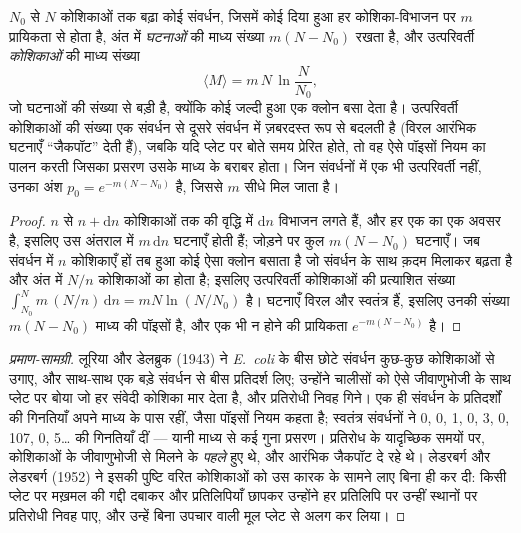 \begin{theorem}[किसी बढ़ते संवर्धन में उत्परिवर्ती]\label{thm:b2:genome-diversification:luria}
$N_0$ से $N$ कोशिकाओं तक बढ़ा कोई संवर्धन, जिसमें कोई दिया हुआ 
हर कोशिका-विभाजन पर $m$ प्रायिकता से होता है, अंत में 
\emph{घटनाओं} की माध्य संख्या $m(N - N_0)$ रखता है, और उत्परिवर्ती
\emph{कोशिकाओं} की माध्य संख्या
\[
\langle M\rangle = m\,N\,\ln\frac{N}{N_0},
\]
जो घटनाओं की संख्या से बड़ी है, क्योंकि कोई जल्दी हुआ  एक
क्लोन बसा देता है। उत्परिवर्ती कोशिकाओं की संख्या एक संवर्धन से दूसरे
संवर्धन में ज़बरदस्त रूप से बदलती है (विरल आरंभिक घटनाएँ ``जैकपॉट'' देती
हैं), जबकि यदि  प्लेट पर बोते समय प्रेरित होते, तो वह ऐसे
पॉइसों नियम का पालन करती जिसका प्रसरण उसके माध्य के बराबर होता। जिन
संवर्धनों में एक भी उत्परिवर्ती नहीं, उनका अंश $p_0 = e^{-m(N - N_0)}$ है, जिससे $m$ सीधे मिल जाता है।
\end{theorem}
\begin{proof}
$n$ से $n + \mathrm{d}n$ कोशिकाओं तक की वृद्धि में $\mathrm{d}n$
विभाजन लगते हैं, और हर एक  का एक अवसर है, इसलिए उस अंतराल
में $m\,\mathrm{d}n$ घटनाएँ होती हैं; जोड़ने पर कुल $m(N - N_0)$ घटनाएँ।
जब संवर्धन में $n$ कोशिकाएँ हों तब हुआ कोई  ऐसा क्लोन बसाता
है जो संवर्धन के साथ क़दम मिलाकर बढ़ता है और अंत में $N/n$ कोशिकाओं का
होता है; इसलिए उत्परिवर्ती कोशिकाओं की प्रत्याशित संख्या
$\int_{N_0}^{N} m\,(N/n)\,\mathrm{d}n = mN\ln(N/N_0)$ है। घटनाएँ विरल
और स्वतंत्र हैं, इसलिए उनकी संख्या $m(N - N_0)$ माध्य की पॉइसों है, और
एक भी न होने की प्रायिकता $e^{-m(N - N_0)}$ है।
\end{proof}
\begin{proof}[प्रमाण-सामग्री]
लूरिया और डेलब्रुक (1943) ने \emph{E.~coli} के बीस छोटे संवर्धन कुछ-कुछ
कोशिकाओं से उगाए, और साथ-साथ एक बड़े संवर्धन से बीस
प्रतिदर्श लिए; उन्होंने चालीसों को ऐसे जीवाणुभोजी के साथ प्लेट पर बोया
जो हर संवेदी कोशिका मार देता है, और प्रतिरोधी निवह गिने। एक ही संवर्धन
के प्रतिदर्शों की गिनतियाँ अपने माध्य के पास रहीं, जैसा पॉइसों नियम कहता
है; स्वतंत्र संवर्धनों ने 0, 0, 1, 0, 3, 0, 107, 0, 5\dots{} की गिनतियाँ
दीं --- यानी माध्य से कई गुना प्रसरण। प्रतिरोध के  यादृच्छिक
समयों पर, कोशिकाओं के जीवाणुभोजी से मिलने के \emph{पहले} हुए थे, और
आरंभिक  जैकपॉट दे रहे थे। लेडरबर्ग और लेडरबर्ग (1952) ने इसकी
पुष्टि वरित कोशिकाओं को उस कारक के सामने लाए बिना ही कर दी: किसी प्लेट
पर मख़मल की गद्दी दबाकर और प्रतिलिपियाँ छापकर उन्होंने हर प्रतिलिपि पर
उन्हीं स्थानों पर प्रतिरोधी निवह पाए, और उन्हें बिना उपचार वाली मूल
प्लेट से अलग कर लिया।
\end{proof}

